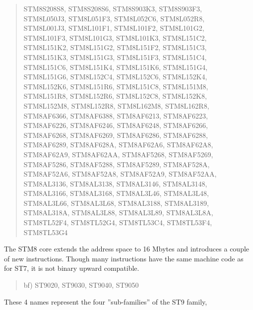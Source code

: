 \documentclass[12pt,twoside]{report}
\begin{document}
\begin{quote}
    STM8S208S8, STM8S208S6, STM8S903K3, STM8S903F3,\\
    STM8L050J3, STM8L051F3, STM8L052C6, STM8L052R8,\\
    STM8L001J3, STM8L101F1, STM8L101F2, STM8L101G2,\\
    STM8L101F3, STM8L101G3, STM8L101K3, STM8L151C2,\\
    STM8L151K2, STM8L151G2, STM8L151F2, STM8L151C3,\\
    STM8L151K3, STM8L151G3, STM8L151F3, STM8L151C4,\\
    STM8L151C6, STM8L151K4, STM8L151K6, STM8L151G4,\\
    STM8L151G6, STM8L152C4, STM8L152C6, STM8L152K4,\\
    STM8L152K6, STM8L151R6, STM8L151C8, STM8L151M8,\\
    STM8L151R8, STM8L152R6, STM8L152C8, STM8L152K8,\\
    STM8L152M8, STM8L152R8, STM8L162M8, STM8L162R8,\\
    STM8AF6366, STM8AF6388, STM8AF6213, STM8AF6223,\\
    STM8AF6226, STM8AF6246, STM8AF6248, STM8AF6266,\\
    STM8AF6268, STM8AF6269, STM8AF6286, STM8AF6288,\\
    STM8AF6289, STM8AF628A, STM8AF62A6, STM8AF62A8,\\
    STM8AF62A9, STM8AF62AA, STM8AF5268, STM8AF5269,\\
    STM8AF5286, STM8AF5288, STM8AF5289, STM8AF528A,\\
    STM8AF52A6, STM8AF52A8, STM8AF52A9, STM8AF52AA,\\
    STM8AL3136, STM8AL3138, STM8AL3146, STM8AL3148,\\
    STM8AL3166, STM8AL3168, STM8AL3L46, STM8AL3L48,\\
    STM8AL3L66, STM8AL3L68, STM8AL3188, STM8AL3189,\\
    STM8AL318A, STM8AL3L88, STM8AL3L89, STM8AL3L8A,\\
    STM8TL52F4, STM8TL52G4, STM8TL53C4, STM8TL53F4,\\
    STM8TL53G4
\end{quote}
The STM8 core extends the address space to 16 Mbytes and introduces
a couple of new instructions.  Though many instructions have the same
machine code as for ST7, it is not binary upward compatible.
\begin{quote}
bf) ST9020, ST9030, ST9040, ST9050
\end{quote}
These 4 names represent the four ''sub-families'' of the ST9 family,
\end{document}
